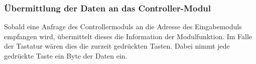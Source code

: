 

\subsubsection{Übermittlung der Daten an das Controller-Modul}
Sobald eine Anfrage des Controllermoduls an die Adresse des Eingabemoduls empfangen wird, übermittelt dieses die Information der Modulfunktion. Im Falle der Tastatur wären dies die zurzeit gedrückten Tasten. Dabei nimmt jede gedrückte Taste ein Byte der Daten ein.